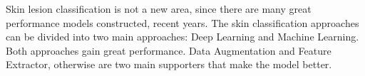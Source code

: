 \documentclass[sensors,article,accept,pdftex,moreauthors]{Definitions/mdpi}
\begin{document}
	
	{Skin lesion classification is not a new area, since there are many great performance models constructed, recent years. The skin classification approaches can be divided into two main approaches: Deep Learning and Machine Learning. Both approaches gain great performance. Data Augmentation and Feature Extractor, otherwise are two main supporters that make the model better.
		\begin{table}[H]
\caption{\hl{Related} %
 Works Summary.}
\label{table:related-work-summary}


\end{table}}
\end{document}
